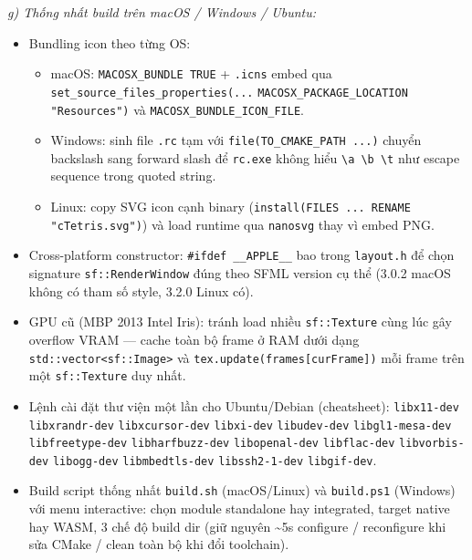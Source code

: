 \documentclass[12pt,a4paper]{article}
\begin{document}
\textit{g) Thống nhất build trên macOS / Windows / Ubuntu:}
\begin{itemize}
    \item Bundling icon theo từng OS:
    \begin{itemize}
        \item macOS: \texttt{MACOSX\_BUNDLE TRUE} + \texttt{.icns} embed qua \texttt{set\_source\_files\_properties(...} \texttt{MACOSX\_PACKAGE\_LOCATION} \texttt{"Resources")} và \texttt{MACOSX\_BUNDLE\_\allowbreak ICON\_FILE}.
        \item Windows: sinh file \texttt{.rc} tạm với \texttt{file(TO\_CMAKE\_PATH ...)} chuyển backslash sang forward slash để \texttt{rc.exe} không hiểu \texttt{\textbackslash a \textbackslash b \textbackslash t} như escape sequence trong quoted string.
        \item Linux: copy SVG icon cạnh binary (\texttt{install(FILES ... RENAME "cTetris.svg")}) và load runtime qua \texttt{nanosvg} thay vì embed PNG.
    \end{itemize}
    \item Cross-platform constructor: \texttt{\#ifdef \_\_APPLE\_\_} bao trong \texttt{layout.h} để chọn signature \texttt{sf::RenderWindow} đúng theo SFML version cụ thể (3.0.2 macOS không có tham số style, 3.2.0 Linux có).
    \item GPU cũ (MBP 2013 Intel Iris): tránh load nhiều \texttt{sf::Texture} cùng lúc gây overflow VRAM — cache toàn bộ frame ở RAM dưới dạng \texttt{std::vector<sf::Image>} và \texttt{tex.update(frames[curFrame])} mỗi frame trên một \texttt{sf::Texture} duy nhất.
    \item Lệnh cài đặt thư viện một lần cho Ubuntu/Debian (cheatsheet): \texttt{libx11-dev} \texttt{libxrandr-dev} \texttt{libxcursor-dev} \texttt{libxi-dev} \texttt{libudev-dev} \texttt{libgl1-mesa-dev} \texttt{libfreetype-dev} \texttt{libharfbuzz-dev} \texttt{libopenal-dev} \texttt{libflac-dev} \texttt{libvorbis-dev} \texttt{libogg-dev} \texttt{libmbedtls-dev} \texttt{libssh2-1-dev} \texttt{libgif-dev}.
    \item Build script thống nhất \texttt{build.sh} (macOS/Linux) và \texttt{build.ps1} (Windows) với menu interactive: chọn module standalone hay integrated, target native hay WASM, 3 chế độ build dir (giữ nguyên \textasciitilde{}5s configure / reconfigure khi sửa CMake / clean toàn bộ khi đổi toolchain).
\end{itemize}
\end{document}

